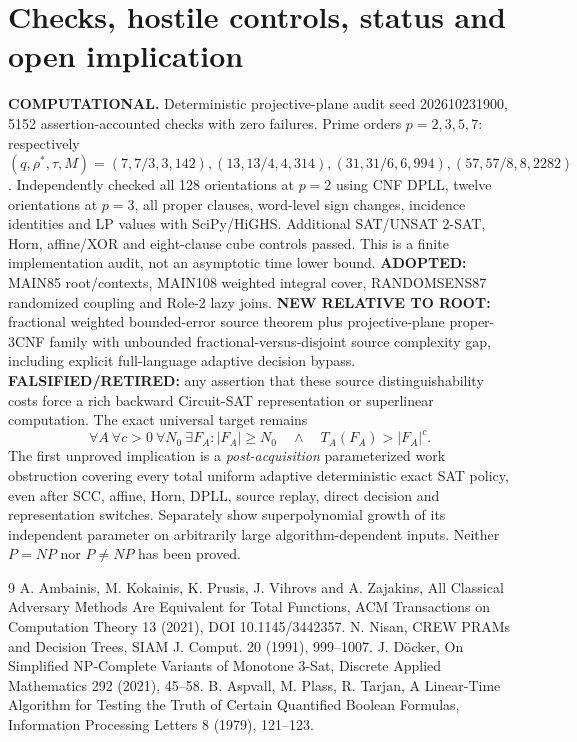\documentclass[11pt]{article}
\begin{document}
\section{Checks, hostile controls, status and open implication}
\textbf{COMPUTATIONAL.} Deterministic projective-plane audit seed 202610231900, 5152 assertion-accounted checks with zero failures. Prime orders $p=2,3,5,7$: respectively $(q,\rho^*,\tau,M)=(7,7/3,3,142),(13,13/4,4,314),(31,31/6,6,994),(57,57/8,8,2282)$. Independently checked all 128 orientations at $p=2$ using CNF DPLL, twelve orientations at $p=3$, all proper clauses, word-level sign changes, incidence identities and LP values with SciPy/HiGHS. Additional SAT/UNSAT 2-SAT, Horn, affine/XOR and eight-clause cube controls passed. This is a finite implementation audit, not an asymptotic time lower bound.
\textbf{ADOPTED:} MAIN85 root/contexts, MAIN108 weighted integral cover, RANDOMSENS87 randomized coupling and Role-2 lazy joins. \textbf{NEW RELATIVE TO ROOT:} fractional weighted bounded-error source theorem plus projective-plane proper-3CNF family with unbounded fractional-versus-disjoint source complexity gap, including explicit full-language adaptive decision bypass. \textbf{FALSIFIED/RETIRED:} any assertion that these source distinguishability costs force a rich backward Circuit-SAT representation or superlinear computation. The exact universal target remains
\[
\forall A\ \forall c>0\ \forall N_0\ \exists F_A:
|F_A|\ge N_0\quad\wedge\quad T_A(F_A)>|F_A|^c.
\]
The first unproved implication is a \emph{post-acquisition} parameterized work obstruction covering every total uniform adaptive deterministic exact SAT policy, even after SCC, affine, Horn, DPLL, source replay, direct decision and representation switches. Separately show superpolynomial growth of its independent parameter on arbitrarily large algorithm-dependent inputs. Neither $P=NP$ nor $P\ne NP$ has been proved.
\begin{thebibliography}{9}
 A. Ambainis, M. Kokainis, K. Prusis, J. Vihrovs and A. Zajakins, All Classical Adversary Methods Are Equivalent for Total Functions, ACM Transactions on Computation Theory 13 (2021), DOI 10.1145/3442357.
 N. Nisan, CREW PRAMs and Decision Trees, SIAM J. Comput. 20 (1991), 999--1007.
 J. D\"ocker, On Simplified NP-Complete Variants of Monotone 3-Sat, Discrete Applied Mathematics 292 (2021), 45--58.
 B. Aspvall, M. Plass, R. Tarjan, A Linear-Time Algorithm for Testing the Truth of Certain Quantified Boolean Formulas, Information Processing Letters 8 (1979), 121--123.
\end{thebibliography}
\end{document}
